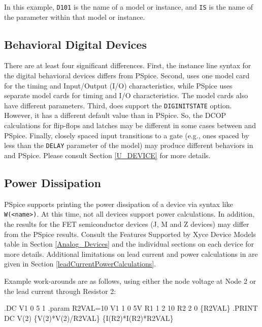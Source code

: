 
In this example, \texttt{D101} is the name of a model or instance, 
and \texttt{IS} is the name of the parameter within that model or instance.

\subsection{Behavioral Digital Devices}
There are at least four significant differences.  First, the instance line
syntax for the \Xyce{} digital behavioral devices differs from PSpice.
Second,  \Xyce{} uses one model card for the timing and Input/Output (I/O)
characteristics, while PSpice uses separate model cards for timing and I/O
characteristics.  The model cards also have different parameters. 
Third, \Xyce{} does support the \texttt{DIGINITSTATE} option. However, it has a
different default value than in PSpice.  So, the DCOP calculations for flip-flops and latches may
be different in some cases between \Xyce{} and PSpice.  Finally, closely spaced input
transitions to a gate (e.g., ones spaced by less than the \texttt{DELAY}
parameter of the \Xyce{} model) may produce different behaviors in \Xyce{}
and PSpice.  Please consult Section \ref{U_DEVICE} for more details.

\subsection{Power Dissipation}
PSpice supports printing the power dissipation of a device via syntax like
\texttt{W(<name>)}.  At this time, not all \Xyce{} devices support power calculations. 
In addition, the \Xyce{} results for the FET semiconductor devices (J, M and Z devices) may 
differ from the PSpice results.  Consult the Features Supported by Xyce Device Models table
in Section \ref{Analog_Devices} and the individual sections on each device for more details.  
Additional limitations on lead current and power
calculations in \Xyce{} are given in Section \ref{leadCurrentPowerCalculations}.

Example work-arounds are as follows, using either the
node voltage at Node 2 or the lead current through Resistor 2:

\begin{vquote}
.DC V1 0 5 1
.param R2VAL=10
V1 1 0 5V
R1 1 2 10
R2 2 0 \{R2VAL\}
.PRINT DC V(2) \{V(2)*V(2)/R2VAL\} \{I(R2)*I(R2)*R2VAL\}
\end{vquote}

